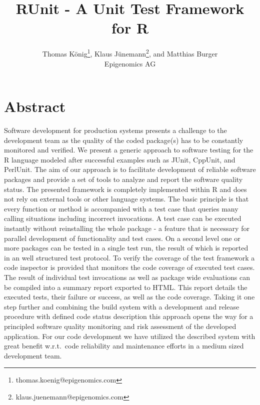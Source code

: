 \documentclass[12pt, a4paper]{article}
\begin{document}
\title{RUnit - A Unit Test Framework for R}
\author{Thomas K\"onig\footnote{thomas.koenig@epigenomics.com}, Klaus J\"unemann\footnote{klaus.juenemann@epigenomics.com}, and Matthias Burger\\Epigenomics AG}
\maketitle
\tableofcontents
\section*{Abstract}
\label{section:abstract}
Software development for production systems presents a challenge to the development team as the quality of the coded package(s) has to be constantly monitored and verified. We present a generic approach to software testing for the R language modeled after successful examples such as JUnit, CppUnit, and PerlUnit. The aim of our approach is to facilitate development of reliable software packages and provide a set of tools to analyze and report the software quality status. The presented framework is completely implemented within R and does not rely on external tools or other language systems. The basic principle is that every function or method is accompanied with a test case that queries many calling situations including incorrect invocations. A test case can be executed instantly without reinstalling the whole package - a feature that is necessary for parallel development of functionality and test cases. On a second level one or more packages can be tested in a single test run, the result of which is reported in an well structured test protocol.
To verify the coverage of the test framework a code inspector is provided that monitors the code coverage of executed test cases. The result of individual test invocations as well as package wide evaluations can be compiled into a summary report exported to HTML. This report details the executed tests, their failure or success, as well as the code coverage. Taking it one step further and combining the build system with a development and release procedure with defined code status description this approach opens the way for a principled software quality monitoring and risk assessment of the developed application.
For our code development we have utilized the described system with great benefit w.r.t.\ code reliability and maintenance efforts in a medium sized development team.
\end{document}

